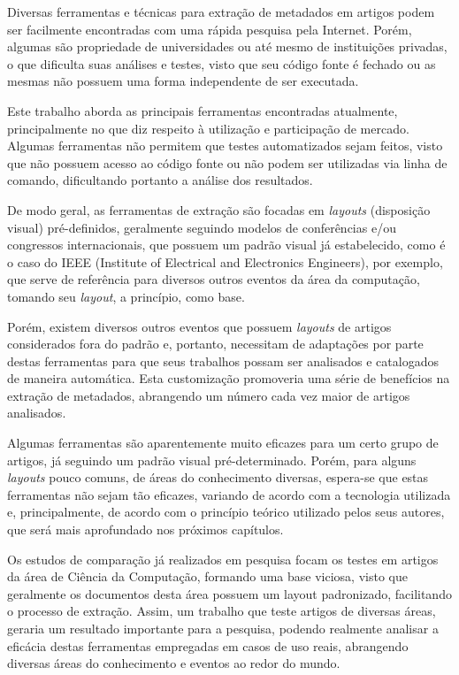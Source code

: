 Diversas ferramentas e técnicas para extração de metadados em artigos podem ser facilmente encontradas com uma rápida pesquisa pela Internet. Porém, algumas são propriedade de universidades ou até mesmo de instituições privadas, o que dificulta suas análises e testes, visto que seu código fonte é fechado ou as mesmas não possuem uma forma independente de ser executada.

Este trabalho aborda as principais ferramentas encontradas atualmente, principalmente no que diz respeito à utilização e participação de mercado. Algumas ferramentas não permitem que testes automatizados sejam feitos, visto que não possuem acesso ao código fonte ou não podem ser utilizadas via linha de comando, dificultando portanto a análise dos resultados.

De modo geral, as ferramentas de extração são focadas em \textit{layouts} (disposição visual) pré-definidos, geralmente seguindo modelos de conferências e/ou congressos internacionais, que possuem um padrão visual já estabelecido, como é o caso do IEEE (Institute of Electrical and Electronics Engineers), por exemplo, que serve de referência para diversos outros eventos da área da computação, tomando seu \textit{layout}, a princípio, como base.

Porém, existem diversos outros eventos que possuem \textit{layouts} de artigos considerados fora do padrão e, portanto, necessitam de adaptações por parte destas ferramentas para que seus trabalhos possam ser analisados e catalogados de maneira automática. Esta customização promoveria uma série de benefícios na extração de metadados, abrangendo um número cada vez maior de artigos analisados.

Algumas ferramentas são aparentemente muito eficazes para um certo grupo de artigos, já seguindo um padrão visual pré-determinado. Porém, para alguns \textit{layouts} pouco comuns, de áreas do conhecimento diversas, espera-se que estas ferramentas não sejam tão eficazes, variando de acordo com a tecnologia utilizada e, principalmente, de acordo com o princípio teórico utilizado pelos seus autores, que será mais aprofundado nos próximos capítulos.

Os estudos de comparação já realizados em pesquisa focam os testes em artigos da área de Ciência da Computação, formando uma base viciosa, visto que geralmente os documentos desta área possuem um layout padronizado, facilitando o processo de extração. Assim, um trabalho que teste artigos de diversas áreas, geraria um resultado importante para a pesquisa, podendo realmente analisar a eficácia destas ferramentas empregadas em casos de uso reais, abrangendo diversas áreas do conhecimento e eventos ao redor do mundo.

